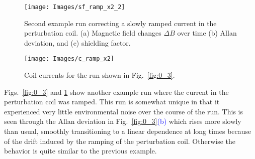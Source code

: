 \begin{figure}
\centering
        \texttt{[image: Images/sf\_ramp\_x2\_2]} \caption[Second
        example run correcting a slowly ramped current in the
        perturbation coil.]{Second
        example run correcting a slowly ramped current in the
        perturbation coil.  (a) Magnetic field changes $\Delta B$ over
        time (b) Allan deviation, and (c) shielding
        factor.}  \label{fig:0_3}
        \texttt{[image: Images/c\_ramp\_x2]} \caption{Coil
        currents for the run shown in
        Fig.~\ref{fig:0_3}.}  \label{fig:0_4}
\end{figure}

Figs.~\ref{fig:0_3} and \ref{fig:0_4} show another example run where
the current in the perturbation coil was ramped.  This run is somewhat
unique in that it experienced very little environmental noise over the
course of the run.  This is seen through the Allan deviation in
Fig.~\ref{fig:0_3}\textcolor{blue}{(b)} which rises more slowly than usual, smoothly
transitioning to a linear dependence at long times because of the
drift induced by the ramping of the perturbation coil.  Otherwise the
behavior is quite similar to the previous example.


